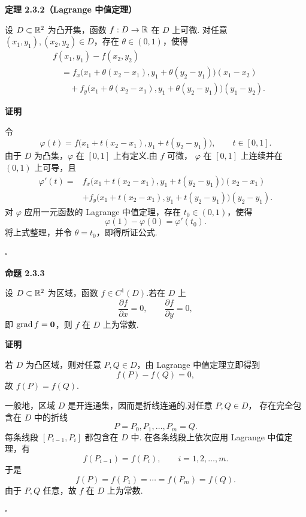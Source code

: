 \textbf{定理 2.3.2（Lagrange 中值定理）}


	设 $D\subset\mathbb{R}^2$ 为凸开集，函数 $f:D\to\mathbb{R}$ 在 $D$ 上可微.
	对任意 $(x_1,y_1),(x_2,y_2)\in D$，存在 $\theta\in(0,1)$，使得
	\[
	\begin{aligned}
	&f(x_1,y_1)-f(x_2,y_2)\\
	&\quad=
	f_x\bigl(x_1+\theta(x_2-x_1),y_1+\theta(y_2-y_1)\bigr)(x_1-x_2)\\
	&\qquad+
	f_y\bigl(x_1+\theta(x_2-x_1),y_1+\theta(y_2-y_1)\bigr)(y_1-y_2).
	\end{aligned}
	\]






\textbf{证明}

令
	\[
	\varphi(t)
	=
	f\bigl(x_1+t(x_2-x_1),y_1+t(y_2-y_1)\bigr),
	\qquad t\in[0,1].
	\]
	由于 $D$ 为凸集，$\varphi$ 在 $[0,1]$ 上有定义.由 $f$ 可微，
	$\varphi$ 在 $[0,1]$ 上连续并在 $(0,1)$ 上可导，且
	\[
	\begin{aligned}
	\varphi'(t)
	={}&
	f_x\bigl(x_1+t(x_2-x_1),y_1+t(y_2-y_1)\bigr)(x_2-x_1)\\
	&+
	f_y\bigl(x_1+t(x_2-x_1),y_1+t(y_2-y_1)\bigr)(y_2-y_1).
	\end{aligned}
	\]
	对 $\varphi$ 应用一元函数的 Lagrange 中值定理，存在 $t_0\in(0,1)$，使得
	\[
	\varphi(1)-\varphi(0)=\varphi'(t_0).
	\]
	将上式整理，并令 $\theta=t_0$，即得所证公式.


$\square$





\textbf{命题 2.3.3}

设 $D\subset\mathbb{R}^2$ 为区域，函数 $f\in C^1(D)$.若在 $D$ 上
	\[
	\frac{\partial f}{\partial x}=0,
	\qquad
	\frac{\partial f}{\partial y}=0,
	\]
	即 $\operatorname{grad}f=\boldsymbol{0}$，则 $f$ 在 $D$ 上为常数.






\textbf{证明}

若 $D$ 为凸区域，则对任意 $P,Q\in D$，由 Lagrange 中值定理立即得到
	\[
	f(P)-f(Q)=0,
	\]
	故 $f(P)=f(Q)$.

	一般地，区域 $D$ 是开连通集，因而是折线连通的.对任意 $P,Q\in D$，
	存在完全包含在 $D$ 中的折线
	\[
	P=P_0,P_1,\ldots,P_m=Q.
	\]
	每条线段 $[P_{i-1},P_i]$ 都包含在 $D$ 中.
	在各条线段上依次应用 Lagrange 中值定理，有
	\[
	f(P_{i-1})=f(P_i),
	\qquad i=1,2,\ldots,m.
	\]
	于是
	\[
	f(P)=f(P_1)=\cdots=f(P_m)=f(Q).
	\]
	由于 $P,Q$ 任意，故 $f$ 在 $D$ 上为常数.


$\square$






